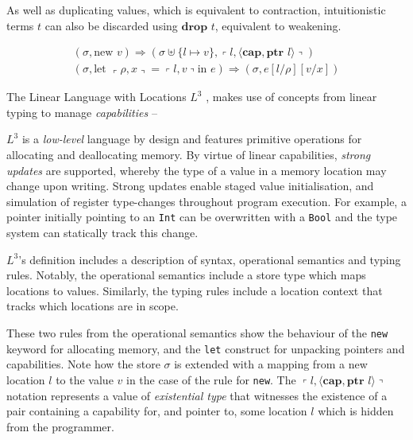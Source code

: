 \documentclass[]{unswthesis}
\newcommand{\ptr}[1]{\textbf{ptr $#1$}}
\newcommand{\capa}{\textbf{cap}}
\newcommand{\lquine}{\left\ulcorner}
\newcommand{\rquine}{\right\urcorner}
\newcommand{\drop}[1]{\textbf{drop $#1$}}
\let\c\texttt
\let\i\textit
\begin{document}
As well as duplicating values, which is equivalent to contraction, intuitionistic terms $t$ can also be discarded using $\drop{t}$, equivalent to weakening.

\begin{eqnarray*}
(\sigma, \text{new } v) \Rightarrow (\sigma \uplus \{l \mapsto v\},
  \lquine l, \langle \capa, \ptr l \rangle \rquine)
\\
(\sigma, \text{let } \lquine \rho, x \rquine = \lquine l, v \rquine \text{in } e)
  \Rightarrow
  (\sigma, e[l/\rho][v/x])
\end{eqnarray*}

\pagebreak


The Linear Language with Locations $L^3$ \cite{ahmed05}, makes use of concepts from linear typing to manage \i{capabilities} -- 

$L^3$ is a \i{low-level} language by design and features primitive operations for allocating and deallocating memory. By virtue of linear capabilities, \i{strong updates} are supported, whereby the type of a value in a memory location may change upon writing. Strong updates enable staged value initialisation, and simulation of register type-changes throughout program execution. For example, a pointer initially pointing to an \c{Int} can be overwritten with a \c{Bool} and the type system can statically track this change.

$L^3$'s definition includes a description of syntax, operational semantics and typing rules. Notably, the operational semantics include a store type which maps locations to values. Similarly, the typing rules include a location context that tracks which locations are in scope.



These two rules from the operational semantics show the behaviour of the \c{new} keyword for allocating memory, and the \c{let} construct for unpacking pointers and capabilities. Note how the store $\sigma$ is extended with a mapping from a new location $l$ to the value $v$ in the case of the rule for \c{new}. The $\lquine l, \langle \capa, \ptr l \rangle \rquine$ notation represents a value of \i{existential type} that witnesses the existence of a pair containing a capability for, and pointer to, some location $l$ which is hidden from the programmer.
\end{document}

